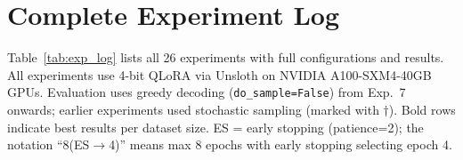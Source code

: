\clearpage
\appendix

\section{Complete Experiment Log}
\label{app:experiments}

Table~\ref{tab:exp_log} lists all 26 experiments with full configurations and results. All experiments use 4-bit QLoRA via Unsloth on NVIDIA A100-SXM4-40GB GPUs. Evaluation uses greedy decoding (\texttt{do\_sample=False}) from Exp.~7 onwards; earlier experiments used stochastic sampling (marked with $\dagger$). Bold rows indicate best results per dataset size. ES = early stopping (patience=2); the notation ``8(ES$\to$4)'' means max 8 epochs with early stopping selecting epoch 4.

\begin{table}[t]
\centering
\caption{Complete experiment log. All models are Qwen3-8B (4-bit) except Exp.~1 (Llama 3.1 8B). LoRA config is $r$/$\alpha$ with dropout 0.05 unless noted. $\dagger$ = stochastic eval (inflated). $\ddagger$ = thinking enabled (mismatch).}
\label{tab:exp_log}
\end{table}
